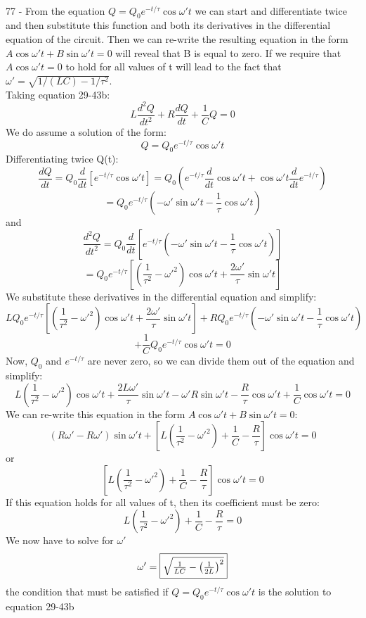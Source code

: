 \documentclass{report}
\begin{document}
\paragraph{}
77 - From the equation $Q = Q_0 e^{-t / \tau} \cos \omega' t$ we can start and differentiate twice and then substitute this function and both its derivatives in the differential equation of the circuit. Then we can re-write the resulting equation in the form $A \cos \omega' t + B \sin \omega' t = 0$ will reveal that B is equal to zero. If we require that $A \cos \omega' t = 0$ to hold for all values of t will lead to the fact that $\omega' = \sqrt{1 / (LC) - 1 / \tau^2}$.\\
Taking equation 29-43b:
$$L\frac{d^2Q}{dt^2} + R\frac{dQ}{dt} + \frac{1}{C}Q = 0$$
We do assume a solution of the form:
$$Q = Q_0e^{-t / \tau} \cos \omega' t$$
Differentiating twice Q(t):
$$\frac{dQ}{dt} = Q_0 \frac{d}{dt}[e^{-t / \tau} \cos \omega' t] = Q_0 \left( e^{-t / \tau} \frac{d}{dt} \cos \omega' t + \cos \omega' t \frac{d}{dt} e^{-t / \tau} \right)$$
$$= Q_0 e^{-t / \tau} \left( -\omega' \sin \omega' t - \frac{1}{\tau} \cos \omega' t \right)$$
and
$$\frac{d^2Q}{dt^2} = Q_0 \frac{d}{dt}\left[ e^{-t / \tau} \left( -\omega' \sin \omega' t - \frac{1}{\tau} \cos \omega' t \right) \right]$$
$$= Q_0 e^{-t / \tau} \left[ \left( \frac{1}{\tau^2} -\omega'^2 \right) \cos \omega' t +\frac{2 \omega'}{\tau} \sin \omega' t \right]$$
We substitute these derivatives in the differential equation and simplify:
$$LQ_0 e^{-t / \tau} \left[ \left( \frac{1}{\tau^2} -\omega'^2 \right) \cos \omega' t +\frac{2 \omega'}{\tau} \sin \omega' t \right] + RQ_0e^{-t / \tau} \left( -\omega' \sin \omega' t - \frac{1}{\tau} \cos \omega' t \right)$$
$$+ \frac{1}{C}Q_0e^{-t / \tau} \cos \omega' t = 0$$
Now, $Q_0$ and $e^{-t / \tau}$ are never zero, so we can divide them out of the equation and simplify:
$$L \left( \frac{1}{\tau^2} -\omega'^2 \right) \cos \omega' t +\frac{2 L \omega'}{\tau} \sin \omega' t - \omega' R \sin \omega' t - \frac{R}{\tau} \cos \omega' t +\frac{1}{C} \cos \omega' t = 0$$
We can re-write this equation in the form $A \cos \omega' t + B \sin \omega' t = 0$:
$$(R \omega' - R \omega') \sin \omega' t + \left[ L \left( \frac{1}{\tau^2} - \omega'^2 \right) + \frac{1}{C} - \frac{R}{\tau} \right] \cos \omega' t = 0$$
or
$$\left[ L \left( \frac{1}{\tau^2} - \omega'^2 \right) + \frac{1}{C} - \frac{R}{\tau} \right] \cos \omega' t = 0$$
If this equation holds for all values of t, then its coefficient must be zero:
$$L \left( \frac{1}{\tau^2} - \omega'^2 \right) + \frac{1}{C} - \frac{R}{\tau} = 0$$
We now have to solve for $\omega'$
$$\omega' = \fbox{$\sqrt{\frac{1}{LC} - \left( \frac{1}{2L} \right)^2}$}$$
the condition that must be satisfied if $Q = Q_0e^{-t / \tau} \cos \omega' t$ is the solution to equation 29-43b
\end{document}
